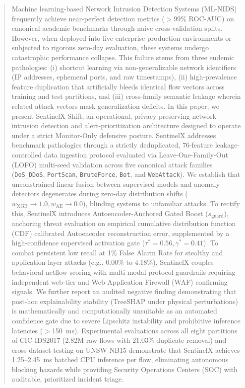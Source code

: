 \documentclass[conference]{IEEEtran}
\begin{document}
\begin{abstract}
Machine learning-based Network Intrusion Detection Systems (ML-NIDS) frequently achieve near-perfect detection metrics ($>$99\% ROC-AUC) on canonical academic benchmarks through naive cross-validation splits. However, when deployed into live enterprise production environments or subjected to rigorous zero-day evaluation, these systems undergo catastrophic performance collapse. This failure stems from three endemic pathologies: (i) shortcut learning via non-generalizable network identifiers (IP addresses, ephemeral ports, and raw timestamps), (ii) high-prevalence feature duplication that artificially bleeds identical flow vectors across training and test partitions, and (iii) cross-family semantic leakage wherein related attack vectors mask generalization deficits. In this paper, we present SentinelX-Shift, an operational, privacy-preserving network intrusion detection and alert-prioritization architecture designed to operate under a strict Monitor-Only defensive posture. SentinelX addresses benchmark pathologies through a strictly deduplicated, 76-feature leakage-controlled data ingestion protocol evaluated via Leave-One-Family-Out (LOFO) multi-seed validation across five canonical attack families (\texttt{DoS\_DDoS}, \texttt{PortScan}, \texttt{BruteForce}, \texttt{Bot}, and \texttt{WebAttack}). We establish that unconstrained linear fusion between supervised models and anomaly detectors degenerates during zero-day distribution shifts ($w_{\text{XGB}} \to 1.0, w_{\text{AE}} \to 0.0$), blinding systems to unfamiliar attacks. To rectify this, SentinelX introduces Autoencoder-Anchored Gated Boost ($s_{\text{guard}}$), anchoring threat evaluation on empirical cumulative distribution function (CDF) calibrated Autoencoder reconstruction error, supplemented by a high-confidence supervised activation gate ($\tau^* = 0.56, \gamma^* = 0.41$). To combat persistent low recall at 1\% False Alarm Rate for stealthy and application-layer attacks (e.g., $0.00\%$ to $4.18\%$), SentinelX couples behavioral netflow scoring with multi-modal protocol guardrails requiring independent web-tier and Web Application Firewall (WAF) confirming signals. We further report an audited negative finding demonstrating that post-hoc explainability stability (TreeSHAP under physical perturbations) is mathematically and computationally unsuitable as an automated confidence gate due to severe Lipschitz instability and prohibitive inference latencies ($>$150~ms). Experimental evaluations across all eight partitions of CIC-IDS2017 (2.82M raw flows with 21.03\% duplicate removal) and cross-dataset testing on UNSW-NB15 demonstrate that SentinelX achieves 1.25--2.45~ms batched CPU inference per flow, eliminating autonomous blocking hazards while providing Security Operations Centers (SOC) with auditable, prioritized incident triage.
\end{abstract}
\end{document}

